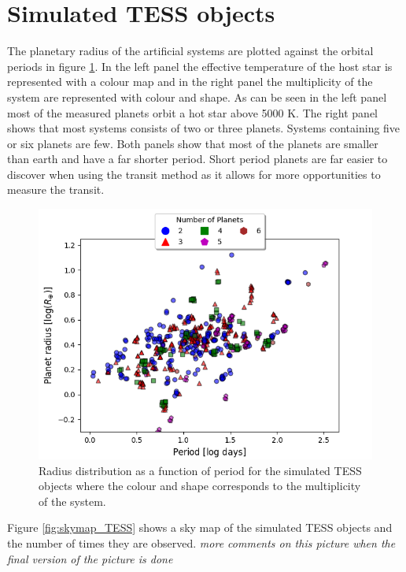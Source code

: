 \documentclass[12pt]{report}
\begin{document}
\section{Simulated TESS objects}
	The planetary radius of the artificial systems are plotted against the orbital periods in figure \ref{fig:RP_plot_temp_multi}. In the left panel the effective temperature of the host star is represented with a colour map and in the right panel the multiplicity of the system are represented with colour and shape. As can be seen in the left panel most of the measured planets orbit a hot star above 5000 K. The right panel shows that most systems consists of two or three planets. Systems containing five or six planets are few. Both panels show that most of the planets are smaller than earth and have a far shorter period. Short period planets are far easier to discover when using the transit method as it allows for more opportunities to measure the transit.

\begin{figure}[h!]
 	 \centering
 	 \includegraphics[width=\textwidth]{img/R_P-plot_numP1.png}
 	  	 \caption{Radius distribution as a function of period for the simulated TESS objects where the colour and shape corresponds to the multiplicity of the system.}
 	  	 \label{fig:RP_plot_temp_multi}
\end{figure}
	\newpage Figure \ref{fig:skymap_TESS} shows a sky map of the simulated TESS objects and the number of times they are observed. \textit{more comments on this picture when the final version of the picture is done}
\end{document}
